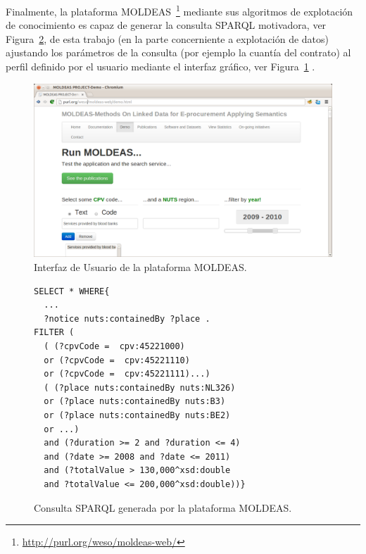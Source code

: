 \documentclass[a4paper,final,11pt,fleqn,twoside]{book}  %
\begin{document}
Finalmente, la plataforma MOLDEAS~\footnote{\url{http://purl.org/weso/moldeas-web/}} mediante sus algoritmos de explotación de conocimiento es capaz de generar la consulta SPARQL 
motivadora, ver Figura~\ref{figure:expanded}, de esta trabajo (en la parte concerniente a explotación de datos) ajustando los parámetros de la consulta (por ejemplo 
la cuantía del contrato) al perfil definido por el usuario mediante el interfaz gráfico, ver Figura~\ref{fig:moldeas-web} .

\begin{figure}[!htb]
\centering
	\includegraphics[width=14cm]{./img/interfaz}
\caption{Interfaz de Usuario de la plataforma MOLDEAS.}
\label{fig:moldeas-web}
\end{figure}



 \begin{figure}[!ht] 
\begin{center}
\begin{lstlisting}[language=SPARQL]
SELECT * WHERE{
  ...
  ?notice nuts:containedBy ?place .
FILTER (  
  ( (?cpvCode =  cpv:45221000) 
  or (?cpvCode =  cpv:45221110) 
  or (?cpvCode =  cpv:45221111)...)
  ( (?place nuts:containedBy nuts:NL326) 
  or (?place nuts:containedBy nuts:B3) 
  or (?place nuts:containedBy nuts:BE2) 
  or ...) 
  and (?duration >= 2 and ?duration <= 4) 
  and (?date >= 2008 and ?date <= 2011) 
  and (?totalValue > 130,000^xsd:double 
  and ?totalValue <= 200,000^xsd:double))}
\end{lstlisting}
\caption{Consulta SPARQL generada por la plataforma MOLDEAS.}
\label{figure:expanded}
\end{center}
\end{figure}
\end{document}
